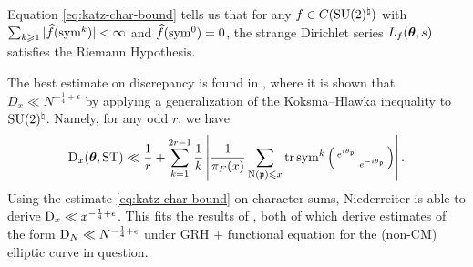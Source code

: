 Equation \eqref{eq:katz-char-bound} tells us that for any 
$f\in C(\operatorname{SU}(2)^\natural)$ with 
$\sum_{k\geqslant 1} |\widehat f(\operatorname{sym}^k)|<\infty$ and $\widehat f(\operatorname{sym}^0) = 0$, 
the strange Dirichlet series $L_f({\boldsymbol\theta},s)$ satisfies the Riemann Hypothesis. 

The best estimate on discrepancy is found in 
\cite{niederreiter-1991}, where it is shown that $D_x \ll N^{-\frac 1 4+\epsilon}$ 
by applying a generalization of the Koksma--Hlawka inequality to 
$\operatorname{SU}(2)^\natural$. Namely, for any odd $r$, we have 
\[
	\operatorname{D}_x({\boldsymbol\theta},\mathrm{ST}) \ll \frac 1 r + \sum_{k=1}^{2 r -1} \frac 1 k \left| \frac{1}{\pi_F(x)} \sum_{\operatorname{N}(\mathfrak{p})\leqslant x} \operatorname{tr}\operatorname{sym}^k\left(\begin{smallmatrix} e^{i \theta_{\mathfrak{p}}} &  \\  & e^{- i \theta_{\mathfrak{p}}} \end{smallmatrix}\right)\right| .
\]
Using the estimate \eqref{eq:katz-char-bound} on character sums, Niederreiter 
is able to derive $\operatorname{D}_x \ll x^{-\frac 1 4+\epsilon}$. This fits the results of 
\cite{bucar-kedlaya-2015,rouse-thorner-2016}, both of which derive estimates 
of the form $\operatorname{D}_N \ll N^{-\frac 1 4+\epsilon}$ under GRH + functional equation 
for the (non-CM) elliptic curve in question. 
